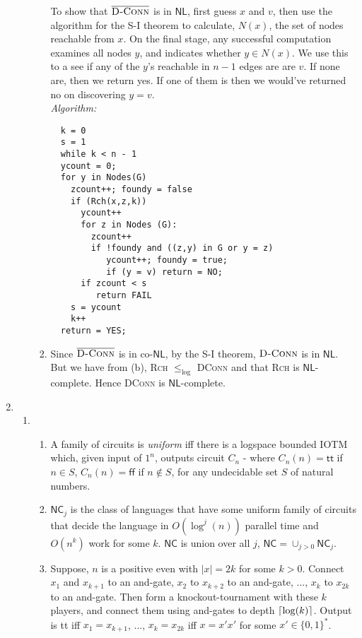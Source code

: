 \documentclass[a4paper, draft, 12pt]{article}
\begin{document}
\begin{enumerate}
\begin{enumerate}
\begin{enumerate}
  To show that $\overline{\textsc{D-Conn}}$ is 
  in $\textsf{NL}$, first guess $x$ and $v$, then use the algorithm
  for the S-I theorem to calculate, 
  $N(x)$, the set of nodes reachable from $x$.
  On the final stage, any successful computation examines all nodes $y$,
  and indicates whether $y \in N(x)$. 
  We use this to a see if any of the $y$'s reachable in $n-1$ edges are are $v$. 
  If none are, then we return yes. If one of them is then we would've returned no
  on discovering $y = v$. \\
  \textit{Algorithm:} \\
  \begin{verbatim}
  k = 0 
  s = 1 
  while k < n - 1
  ycount = 0;
  for y in Nodes(G)
    zcount++; foundy = false
    if (Rch(x,z,k))
      ycount++
      for z in Nodes (G):
        zcount++
        if !foundy and ((z,y) in G or y = z)
           ycount++; foundy = true;
           if (y = v) return = NO; 
      if zcount < s
         return FAIL
    s = ycount
    k++
  return = YES;
  \end{verbatim}
  \item %
  Since  $\overline{\textsc{D-Conn}}$ is in $\text{co-}\textsf{NL}$, 
  by the S-I theorem, $\textsc{D-Conn}$ is in $\textsf{NL}$. 
  But we have from (b), \textsc{Rch} $\leqslant_{\text{log}}$ \textsc{DConn}
  and that \textsc{Rch} is $\textsf{NL}$-complete. 
  Hence \textsc{DConn} is $\textsf{NL}$-complete. 
  \end{enumerate}


\end{enumerate}
\item %
  \begin{enumerate}
  \item %
  \begin{enumerate}
  \item %
  A family of circuits is \textit{uniform} iff there is a logspace bounded 
  IOTM which, given input of $1^n$, outputs circuit $C_n$ - where 
  $C_n(n) = \textsf{tt}$ if $n \in S$, $C_n(n) = \textsf{ff}$ if $n \notin S$,
  for any undecidable set $S$ of natural numbers. 
  \item %
  $\textsf{NC}_j$ is the class of languages that have some uniform family of circuits that 
  decide the language in $O(\log^j(n))$ parallel time and $O(n^k)$ work for some $k$.
  $\textsf{NC}$ is union over all $j$, $\textsf{NC} = \cup_{j > 0} \textsf{NC}_j$. 
  \item %
  Suppose, $n$ is a positive even with $|x| = 2k$ for some $k > 0$. 
  Connect $x_1$ and $x_{k+1}$ to an and-gate, $x_2$ to $x_{k+2}$ to an and-gate, ..., $x_{k}$ to $x_{2k}$
  to an and-gate. Then form a knockout-tournament with these $k$ players, and connect them 
  using and-gates to depth $\lceil\log(k)\rceil$. Output is \textsf{tt} iff  $x_1 = x_{k+1}$, ...,
  $x_{k} = x_{2k}$ iff $x = x'x'$ for some $x' \in \{0,1\}^{*}$. 


\end{enumerate}
\end{enumerate}
\end{enumerate}
\end{document}
